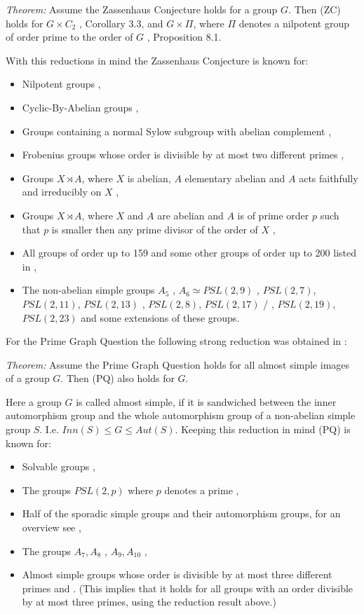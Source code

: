 \documentclass[a4paper,11pt]{report}
\begin{document}
{{ \emph{Theorem:} Assume the Zassenhaus Conjecture holds for a group $G$. Then (ZC) holds for $G \times C_2$ \cite{HoefertKimmerle}, Corollary 3.3, and $G \times \Pi$, where $\Pi$ denotes a nilpotent group of order prime to the order of $G$ \cite{HertweckEdinb}, Proposition 8.1.

 With this reductions in mind the Zassenhaus Conjecture is known for: 
\begin{itemize}
\item  Nilpotent groups \cite{Weiss91}, 
\item  Cyclic-By-Abelian groups \cite{CyclicByAbelian}, 
\item  Groups containing a normal Sylow subgroup with abelian complement \cite{HertweckColloq}, 
\item  Frobenius groups whose order is divisible by at most two different primes \cite{JuriaansMilies}, 
\item  Groups $X \rtimes A$, where $X$ is abelian, $A$ elementary abelian and $A$ acts faithfully and irreducibly on $X$ \cite{SehgalWeiss}, 
\item  Groups $X \rtimes A$, where $X$ and $A$ are abelian and $A$ is of prime order $p$ such that $p$ is smaller then any prime divisor of the order of $X$ \cite{MRSW}, 
\item  All groups of order up to 159 and some other groups of order up to 200 listed
in \cite{HermanSingh}, 
\item  The non-abelian simple groups $A_5$ \cite{LP}, $A_6 \simeq PSL(2,9)$ \cite{HerA6}, $PSL(2,7)$, $PSL(2,11)$, $PSL(2,13)$ \cite{HertweckBrauer}, $PSL(2,8)$, $PSL(2,17)$ \cite{KonovalovKimmiStAndrews} / \cite{Gildea}, $PSL(2,19)$, $PSL(2,23)$ \cite{BaMaM10} and some extensions of these groups. 
\end{itemize}
 For the Prime Graph Question the following strong reduction was obtained in \cite{KonovalovKimmiStAndrews}: 

 \emph{Theorem:} Assume the Prime Graph Question holds for all almost simple images of a group $G$. Then (PQ) also holds for $G.$

 Here a group $G$ is called almost simple, if it is sandwiched between the inner automorphism
group and the whole automorphism group of a non-abelian simple group $S$. I.e. $Inn(S) \leq G \leq Aut(S).$ Keeping this reduction in mind (PQ) is known for: 
\begin{itemize}
\item  Solvable groups \cite{KimmiPQ}, 
\item  The groups $PSL(2,p)$ where $p$ denotes a prime \cite{HertweckBrauer}, 
\item  Half of the sporadic simple groups and their automorphism groups, for an
overview see \cite{KonovalovKimmiStAndrews}, 
\item  The groups $A_7, A_8$ \cite{SalimA7A8}, $A_9, A_{10}$ \cite{SalimA9A10}, 
\item  Almost simple groups whose order is divisible by at most three different
primes \cite{KonovalovKimmiStAndrews} and \cite{BaMaM10}. (This implies that it holds for all groups with an order divisible by at
most three primes, using the reduction result above.) 
\end{itemize}
 }

}
\end{document}

